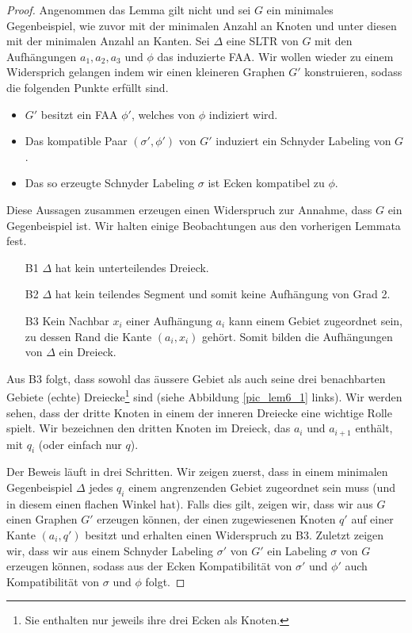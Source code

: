\begin{proof}
Angenommen das Lemma gilt nicht und sei $G$ ein minimales Gegenbeispiel, wie zuvor mit der minimalen Anzahl an Knoten und unter diesen mit der minimalen Anzahl an Kanten. Sei $\Delta$ eine SLTR von $G$ mit den Aufhängungen $a_1,a_2,a_3$ und $\phi$ das induzierte FAA. Wir wollen wieder zu einem Widersprich gelangen indem wir einen kleineren Graphen $G'$ konstruieren, sodass die folgenden Punkte erfüllt sind.
\begin{itemize}
\item $G'$ besitzt ein FAA $\phi'$, welches von $\phi$ indiziert wird.
\item Das kompatible Paar $(\sigma',\phi')$ von $G'$ induziert ein Schnyder Labeling von $G$.
\item Das so erzeugte Schnyder Labeling $\sigma$ ist Ecken kompatibel zu $\phi$.
\end{itemize}
Diese Aussagen zusammen erzeugen einen Widerspruch zur Annahme, dass $G$ ein Gegenbeispiel ist. Wir halten einige Beobachtungen aus den vorherigen Lemmata fest.
\begin{itemize}
\item [B1] $\Delta$ hat kein unterteilendes Dreieck.
\item [B2] $\Delta$ hat kein teilendes Segment und somit keine Aufhängung von Grad 2.
\item [B3] Kein Nachbar $x_i$ einer Aufhängung $a_i$ kann einem Gebiet zugeordnet sein, zu dessen Rand die Kante $(a_i,x_i)$ gehört. Somit bilden die Aufhängungen von $\Delta$ ein Dreieck.
\end{itemize}

Aus B3 folgt, dass sowohl das äussere Gebiet als auch seine drei benachbarten Gebiete (echte) Dreiecke\footnote{Sie enthalten nur jeweils ihre drei Ecken als Knoten.} sind (siehe Abbildung \ref{pic_lem6_1} links). Wir werden sehen, dass der dritte Knoten in einem der inneren Dreiecke eine wichtige Rolle spielt. Wir bezeichnen den dritten Knoten im Dreieck, das $a_i$ und $a_{i+1}$ enthält, mit $q_i$ (oder einfach nur $q$).

Der Beweis läuft in drei Schritten. Wir zeigen zuerst, dass in einem minimalen Gegenbeispiel $\Delta$ jedes $q_i$ einem angrenzenden Gebiet zugeordnet sein muss (und in diesem einen flachen Winkel hat). Falls dies gilt, zeigen wir, dass wir aus $G$ einen Graphen $G'$ erzeugen können, der einen zugewiesenen Knoten $q'$ auf einer Kante $(a_i,q')$ besitzt und erhalten einen Widerspruch zu B3. Zuletzt zeigen wir, dass wir aus einem Schnyder Labeling $\sigma'$ von $G'$ ein Labeling $\sigma$ von $G$ erzeugen können, sodass aus der Ecken Kompatibilität von $\sigma'$ und $\phi'$ auch Kompatibilität von $\sigma$ und $\phi$ folgt.


\end{proof}
